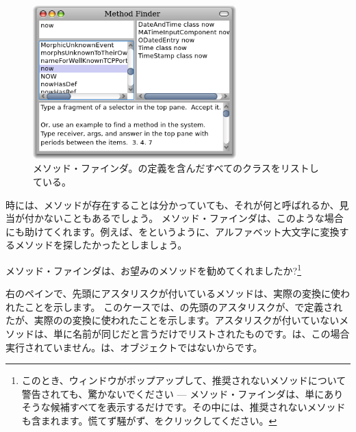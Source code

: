 \documentclass[a4paper,10pt,twoside]{book}
\begin{document}
\begin{figure}[hbt]
\centerline {\includegraphics[width=0.7\textwidth]{methodFinder-now}}
\caption{メソッド・ファインダ。の定義を含んだすべてのクラスをリストしている。
}
\end{figure}

時には、メソッドが存在することは分かっていても、それが何と呼ばれるか、見当が付かないこともあるでしょう。
メソッド・ファインダは、このような場合にも助けてくれます。例えば、をというように、アルファベット大文字に変換するメソッドを探したかったとしましょう。

\noindent
メソッド・ファインダは、お望みのメソッドを勧めてくれましたか?\footnote{このとき、ウィンドウがポップアップして、推奨されないメソッドについて警告されても、驚かないでください --- メソッド・ファインダは、単にありそうな候補すべてを表示するだけです。その中には、推奨されないメソッドも含まれます。慌てず騒がず、をクリックしてください。}

右のペインで、先頭にアスタリスクが付いているメソッドは、実際の変換に使われたことを示します。
このケースでは、の先頭のアスタリスクが、で定義されたが、実際のの変換に使われたことを示します。アスタリスクが付いていないメソッドは、単に名前が同じだと言うだけでリストされたものです。は、この場合実行されていません。は、オブジェクトではないからです。
\end{document}
